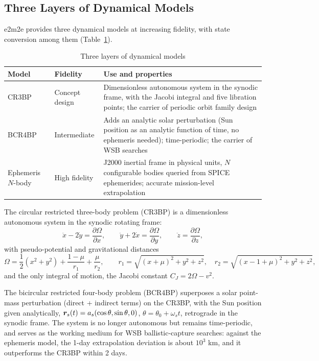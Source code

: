\subsection{Three Layers of Dynamical Models}

e2m2e provides three dynamical models at increasing fidelity, with state
conversion among them (Table~\ref{tab:dynamics}).

\begin{table}[htbp]
\centering\small
\caption{Three layers of dynamical models}
\label{tab:dynamics}
\begin{tabularx}{\textwidth}{@{}llX@{}}
\toprule
\textbf{Model} & \textbf{Fidelity} & \textbf{Use and properties} \\
\midrule
CR3BP & Concept design & Dimensionless autonomous system in the synodic
frame, with the Jacobi integral and five libration points; the carrier of
periodic orbit family design \\
BCR4BP & Intermediate & Adds an analytic solar perturbation (Sun position as
an analytic function of time, no ephemeris needed); time-periodic; the
carrier of WSB searches \\
Ephemeris $N$-body & High fidelity & J2000 inertial frame in physical units,
$N$ configurable bodies queried from SPICE ephemerides; accurate mission-level
extrapolation \\
\bottomrule
\end{tabularx}
\end{table}

The circular restricted three-body problem (CR3BP) is a dimensionless
autonomous system in the synodic rotating frame:
\begin{equation}
  \ddot{x} - 2\dot{y} = \frac{\partial\Omega}{\partial x}, \qquad
  \ddot{y} + 2\dot{x} = \frac{\partial\Omega}{\partial y}, \qquad
  \ddot{z} = \frac{\partial\Omega}{\partial z},
\end{equation}
with pseudo-potential and gravitational distances
\begin{equation}
  \Omega = \frac{1}{2}(x^2 + y^2) + \frac{1-\mu}{r_1} + \frac{\mu}{r_2}, \qquad
  r_1 = \sqrt{(x+\mu)^2 + y^2 + z^2}, \quad
  r_2 = \sqrt{(x-1+\mu)^2 + y^2 + z^2},
\end{equation}
and the only integral of motion, the Jacobi constant $C_J = 2\Omega - v^2$.

The bicircular restricted four-body problem (BCR4BP) superposes a solar
point-mass perturbation (direct + indirect terms) on the CR3BP, with the Sun
position given analytically, $\bm{r}_s(t) = a_s(\cos\theta, \sin\theta, 0)$,
$\theta = \theta_0 + \omega_s t$, retrograde in the synodic frame. The system
is no longer autonomous but remains time-periodic, and serves as the working
medium for WSB ballistic-capture searches: against the ephemeris model, the
1-day extrapolation deviation is about $10^3$ km, and it outperforms the
CR3BP within 2 days.

